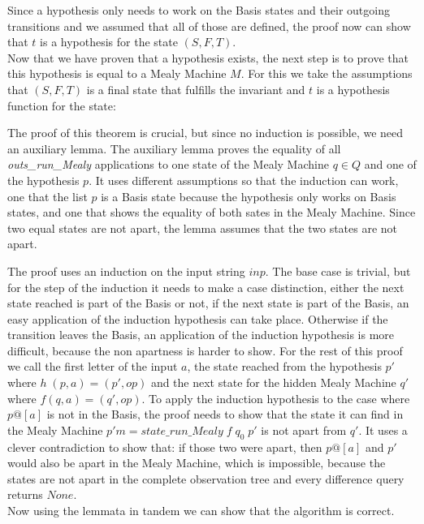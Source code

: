  \begin{myisabelle}
 	\hypofunc
 \end{myisabelle}
Since a hypothesis only needs to work on the Basis states and their outgoing transitions and we assumed that all of those are defined, the proof now can show that $t$ is a hypothesis for the state $(S,F,T)$. \\
Now that we have proven that a hypothesis exists, the next step is to prove that this hypothesis is equal to a Mealy Machine $M$. For this we take the assumptions that $(S,F,T)$ is a final state that fulfills the invariant and $t$ is a hypothesis function for the state: 
\begin{myisabelle}
	\nostepeq
\end{myisabelle}
The proof of this theorem is crucial, but since no induction is possible, we need an auxiliary lemma. The auxiliary lemma proves the equality of all \textit{outs\_run\_Mealy} applications to one state of the Mealy Machine $q\in Q$ and one of the hypothesis $p$. It uses different assumptions so that the induction can work, one that the list $p$ is a Basis state because the hypothesis only works on Basis states, and one that shows the equality of both sates in the Mealy Machine. Since two equal states are not apart, the lemma assumes that the two states are not apart. 
\begin{myisabelle}
	\outsamenostep
\end{myisabelle}
The proof uses an induction on the input string $inp$. The base case is trivial, but for the step of the induction it needs to make a case distinction, either the next state reached is part of the Basis or not, if the next state is part of the Basis, an easy application of the induction hypothesis can take place. Otherwise if the transition leaves the Basis, an application of the induction hypothesis is more difficult, because the non apartness is harder to show. For the rest of this proof we call the first letter of the input $a$, the state reached from the hypothesis $p'$ where $h\; (p,a) =(p',op)$ and the next state for the hidden Mealy Machine $q'$ where $f (q,a)= (q',op)$. To apply the induction hypothesis to the case where $p@[a]$ is not in the Basis, the proof needs to show that the state it can find in the Mealy Machine $p'm= state\_run\_Mealy\; f\;q_0\;p' $ is not apart from $q'$. It uses a clever contradiction to show that: if those two were apart, then $p@[a]$ and $p'$ would also be apart in the Mealy Machine, which is impossible, because the states are not apart in the complete observation tree and every difference query returns $None$.\\
Now using the lemmata in tandem we can show that the algorithm is correct.
